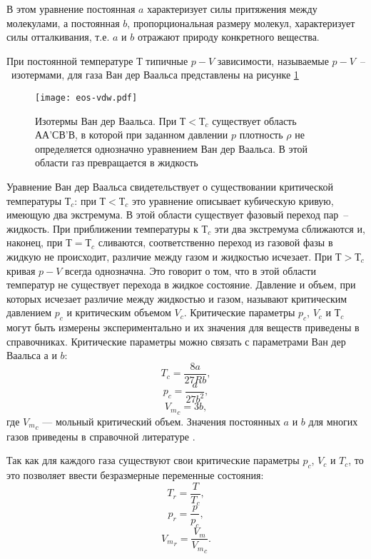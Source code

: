 В этом уравнение постоянная $a$ характеризует силы притяжения между молекулами, а постоянная $b$, пропорциональная размеру молекул, характеризует силы отталкивания, т.е. $a$ и $b$ отражают природу конкретного вещества.

При постоянной температуре $Т$ типичные $p-V$ зависимости, называемые $p-V$~--~изотермами, для газа Ван дер Ваальса представлены на рисунке \ref{fig:eos.vdw}

\begin{figure}[h]
	\begin{center}
		\texttt{[image: eos-vdw.pdf]}
	\end{center}
	\caption{Изотермы Ван дер Ваальса. При $Т < Т_c$ существует область АА'СВ’В, в которой при заданном давлении $p$ плотность $\rho$ не определяется однозначно уравнением Ван дер Ваальса. В этой области газ превращается в жидкость} \label{fig:eos.vdw}
\end{figure}

Уравнение Ван дер Ваальса свидетельствует о существовании критической температуры $Т_{c}$: при $Т < Т_{c}$ это уравнение описывает кубическую кривую, имеющую два экстремума. В этой области существует фазовый переход пар~-- жидкость. При приближении температуры к $Т_{c}$ эти два экстремума сближаются и, наконец, при $Т=Т_{c}$ сливаются, соответственно переход из газовой фазы в жидкую не происходит, различие между газом и жидкостью исчезает.
При $Т > Т_{c}$ кривая $p-V$ всегда однозначна. Это говорит о том, что в этой области температур не существует перехода в жидкое состояние. Давление и объем, при которых исчезает различие между жидкостью и газом, называют критическим давлением $p_{c}$ и критическим объемом $V_{c}$. Критические параметры $p_{c}$, $V_{c}$ и $Т_c$ могут быть измерены экспериментально и их значения для веществ приведены в справочниках. Критические параметры можно связать с параметрами Ван дер Ваальса $а$ и $b$:
\begin{equation}
	T_{c}=\dfrac{8 a}{27 R b},
\end{equation}
\begin{equation}
	p_{c}=\dfrac{a}{27 b^2},
\end{equation}
\begin{equation}
	{V_m}_{c}=3 b,
\end{equation}
где ${V_m}_{c}$ --- мольный критический объем. Значения постоянных $a$ и $b$ для многих газов приведены в справочной литературе \cite{rid1982}.

Так как для каждого газа существуют свои критические параметры $p_{c}$, $V_{c}$ и $T_{c}$, то это позволяет ввести безразмерные переменные состояния:
\begin{equation}
	T_{r}=\dfrac{T}{T_{c}},
\end{equation}
\begin{equation}
	p_{r}=\dfrac{p}{p_{c}},
\end{equation}
\begin{equation}
	{V_m}_{r}=\dfrac{V_m}{{V_m}_{c}}.
\end{equation}

